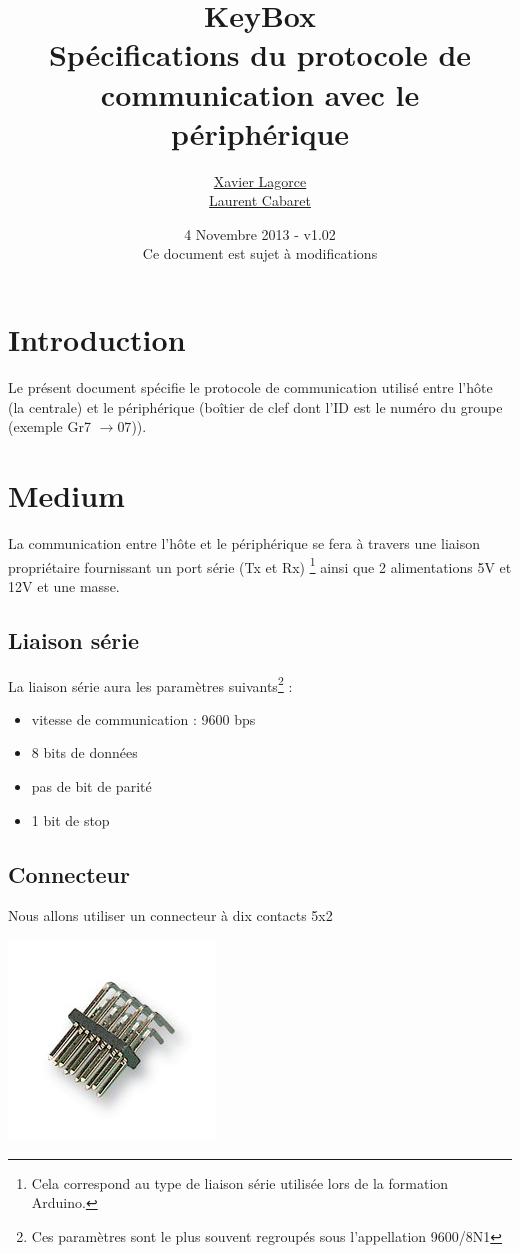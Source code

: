 \documentclass[a4paper, 10pt]{article} %
\title{{\huge KeyBox}\vspace{0.5cm}\\Spécifications du protocole de communication avec le périphérique}
\author{\href{mailto:Xavier.Lagorce@crans.org}{Xavier Lagorce}\\\href{mailto:laurent.cabaret@ecp.fr}{Laurent Cabaret}}
\date{4 Novembre 2013 - v1.02\\Ce document est sujet à modifications}
\newcommand{\saut}{\vspace{0.5cm}}
\begin{document}
\maketitle

\vspace{1cm}

\tableofcontents
\newpage

\section{Introduction}

Le présent document spécifie le protocole de communication utilisé entre l'hôte (la centrale)
et le périphérique (boîtier de clef dont l'ID est le numéro du groupe (exemple Gr7 $\longrightarrow 07$)).

\section{Medium}

La communication entre l'hôte et le périphérique se fera à travers une liaison propriétaire fournissant un port série (Tx et Rx) \footnote{Cela correspond au type de liaison série utilisée lors de la formation Arduino.} ainsi que 2 alimentations 5V et 12V et une masse.

\saut

\subsection{Liaison série}
La liaison série aura les paramètres suivants\footnote{Ces paramètres sont le plus souvent regroupés
sous l'appellation 9600/8N1} :
\begin{itemize}
  \item vitesse de communication : 9600 bps
  \item 8 bits de données
  \item pas de bit de parité
  \item 1 bit de stop
\end{itemize}

\subsection{Connecteur}

Nous allons utiliser un connecteur à dix contacts 5x2 

\begin{center}
\includegraphics[scale=0.5]{HE10.jpg}
\end{center}
\end{document}
